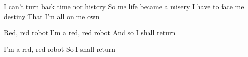 \begin{songbook}
  \begin{verse*}
    I can't turn back time nor history
    So me life became a misery
    I have to face me destiny
    That I'm all on me own
  \end{verse*}

  \begin{chorus}
    Red, red robot
    I'm a red, red robot 
    And so I shall return
  \end{chorus}

  \begin{chorus}
    I'm a red, red robot 
    So I shall return
  \end{chorus}
\endsong
\end{songbook}

